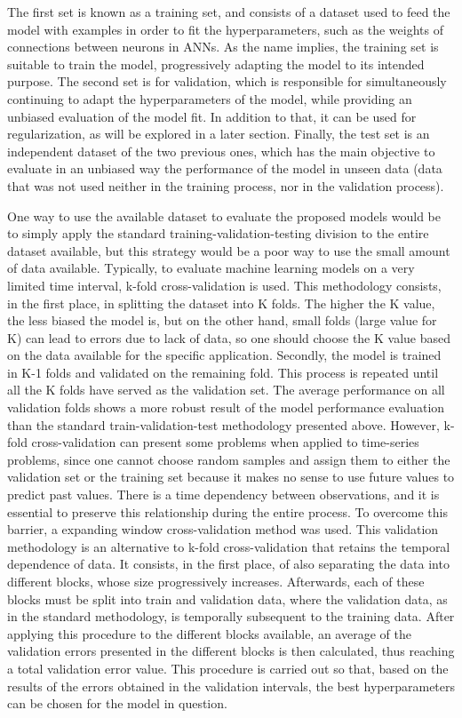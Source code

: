 The first set is known as a training set, and consists of a dataset used to feed the model with examples in order to fit the hyperparameters, such as the weights of connections between neurons in \ac{ANNs}. As the name implies, the training set is suitable to train the model, progressively adapting the model to its intended purpose. The second set is for validation, which is responsible for simultaneously continuing to adapt the hyperparameters of the model, while providing an unbiased evaluation of the model fit. In addition to that, it can be used for regularization, as will be explored in a later section. Finally, the test set is an independent dataset of the two previous ones, which has the main objective to evaluate in an unbiased way the performance of the model in unseen data (data that was not used neither in the training process, nor in the validation process). 

One way to use the available dataset to evaluate the proposed models would be to simply apply the standard training-validation-testing division to the entire dataset available, but this strategy would be a poor way to use the small amount of data available. Typically, to evaluate machine learning models on a very limited time interval, k-fold cross-validation is used. This methodology consists, in the first place, in splitting the dataset into K folds. The higher the K value, the less biased the model is, but on the other hand, small folds (large value for K) can lead to errors due to lack of data, so one should choose the K value based on the data available for the specific application. Secondly, the model is trained in K-1 folds and validated on the remaining fold. This process is repeated until all the K folds have served as the validation set. The average performance on all validation folds shows a more robust result of the model performance evaluation than the standard train-validation-test methodology presented above. However, k-fold cross-validation can present some problems when applied to time-series problems, since one cannot choose random samples and assign them to either the validation set or the training set because it makes no sense to use future values to predict past values. There is a time dependency between observations, and it is essential to preserve this relationship during the entire process. To overcome this barrier, a expanding window cross-validation method was used. This validation methodology is an alternative to k-fold cross-validation that retains the temporal dependence of data. It consists, in the first place, of also separating the data into different blocks, whose size progressively increases. Afterwards, each of these blocks must be split into train and validation data, where the validation data, as in the standard methodology, is temporally subsequent to the training data. After applying this procedure to the different blocks available, an average of the validation errors presented in the different blocks is then calculated, thus reaching a total validation error value. This procedure is carried out so that, based on the results of the errors obtained in the validation intervals, the best hyperparameters can be chosen for the model in question.

